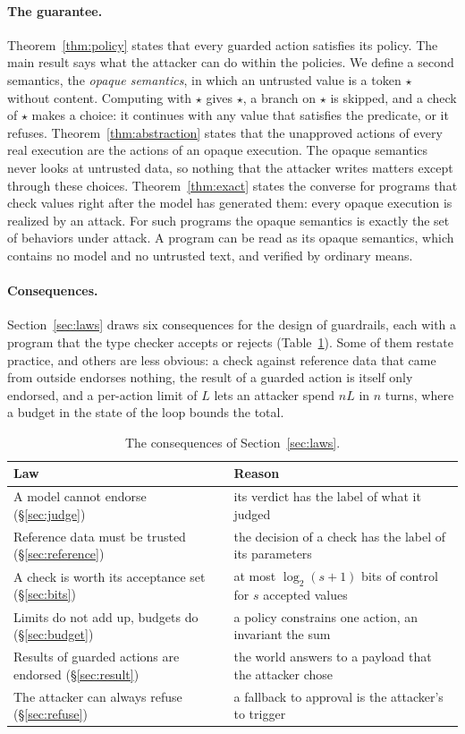 \documentclass[acmsmall,nonacm,screen]{acmart}
\newcommand{\op}{\star}
\begin{document}
\paragraph{The guarantee.} Theorem~\ref{thm:policy} states that every guarded action satisfies
its policy. The main result says what the attacker can do within the policies. We define a
second semantics, the \emph{opaque semantics}, in which an untrusted value is a token $\op$
without content. Computing with $\op$ gives $\op$, a branch on $\op$ is skipped, and a check
of $\op$ makes a choice: it continues with any value that satisfies the predicate, or it
refuses. Theorem~\ref{thm:abstraction} states that the unapproved actions of every real
execution are the actions of an opaque execution. The opaque semantics never looks at
untrusted data, so nothing that the attacker writes matters except through these choices.
Theorem~\ref{thm:exact} states the converse for programs that check values right after the
model has generated them: every opaque execution is realized by an attack. For such programs
the opaque semantics is exactly the set of behaviors under attack. A program can be read as
its opaque semantics, which contains no model and no untrusted text, and verified by ordinary
means.

\paragraph{Consequences.} Section~\ref{sec:laws} draws six consequences for the design of
guardrails, each with a program that the type checker accepts or rejects
(Table~\ref{tab:laws}). Some of them restate practice, and others are less obvious: a check
against reference data that came from outside endorses nothing, the result of a guarded
action is itself only endorsed, and a per-action limit of $L$ lets an attacker spend $nL$ in
$n$ turns, where a budget in the state of the loop bounds the total.

\begin{table}[t]
\caption{The consequences of Section~\ref{sec:laws}.}
\label{tab:laws}
\small
\begin{tabular}{@{}ll@{}}
\toprule
Law & Reason \\
\midrule
A model cannot endorse (\S\ref{sec:judge}) & its verdict has the label of what it judged \\
Reference data must be trusted (\S\ref{sec:reference}) & the decision of a check has the label of its parameters \\
A check is worth its acceptance set (\S\ref{sec:bits}) & at most $\log_2(s+1)$ bits of control for $s$ accepted values \\
Limits do not add up, budgets do (\S\ref{sec:budget}) & a policy constrains one action, an invariant the sum \\
Results of guarded actions are endorsed (\S\ref{sec:result}) & the world answers to a payload that the attacker chose \\
The attacker can always refuse (\S\ref{sec:refuse}) & a fallback to approval is the attacker's to trigger \\
\bottomrule
\end{tabular}
\end{table}
\end{document}
